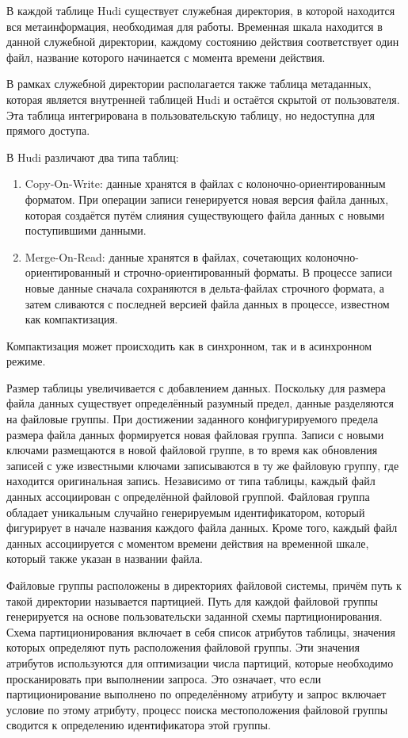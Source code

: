В каждой таблице Hudi существует служебная директория, в которой находится вся метаинформация, необходимая для работы. Временная шкала находится в данной служебной директории, каждому состоянию действия соответствует один файл, название которого начинается с момента времени действия.

В рамках служебной директории располагается также таблица метаданных, которая является внутренней таблицей Hudi и остаётся скрытой от пользователя. Эта таблица интегрирована в пользовательскую таблицу, но недоступна для прямого доступа.

В Hudi различают два типа таблиц: 
\begin{enumerate}
    \item Copy-On-Write: данные хранятся в файлах с колоночно-ориентированным форматом. При операции записи генерируется новая версия файла данных, которая создаётся путём слияния существующего файла данных с новыми поступившими данными.
    \item Merge-On-Read: данные хранятся в файлах, сочетающих колоночно-ориентированный и строчно-ориентированный форматы. В процессе записи новые данные сначала сохраняются в дельта-файлах строчного формата, а затем сливаются с последней версией файла данных в процессе, известном как компактизация. 
\end{enumerate}
Компактизация может происходить как в синхронном, так и в асинхронном режиме.

Размер таблицы увеличивается с добавлением данных. Поскольку для размера файла данных существует определённый разумный предел, данные разделяются на файловые группы. При достижении заданного конфигурируемого предела размера файла данных формируется новая файловая группа. Записи с новыми ключами размещаются в новой файловой группе, в то время как обновления записей с уже известными ключами записываются в ту же файловую группу, где находится оригинальная запись. Независимо от типа таблицы, каждый файл данных ассоциирован с определённой файловой группой. Файловая группа обладает уникальным случайно генерируемым идентификатором, который фигурирует в начале названия каждого файла данных. Кроме того, каждый файл данных ассоциируется с моментом времени действия на временной шкале, который также указан в названии файла.

Файловые группы расположены в директориях файловой системы, причём путь к такой директории называется партицией. Путь для каждой файловой группы генерируется на основе пользовательски заданной схемы партиционирования. Схема партиционирования включает в себя список атрибутов таблицы, значения которых определяют путь расположения файловой группы. Эти значения атрибутов используются для оптимизации числа партиций, которые необходимо просканировать при выполнении запроса. Это означает, что если партиционирование выполнено по определённому атрибуту и запрос включает условие по этому атрибуту, процесс поиска местоположения файловой группы сводится к определению идентификатора этой группы.

